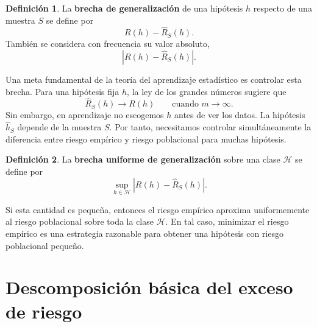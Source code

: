 \documentclass[11pt]{report}
\newenvironment{tcolorbox}[1][]{\par\medskip\noindent\ignorespaces}{\par\medskip}
\theoremstyle{definition}
\newtheorem{definicion}{Definición}[section]
\theoremstyle{plain}
\numberwithin{equation}{section}
\begin{document}
\begin{tcolorbox}[colback=blue!8, colframe=blue!8, boxrule=0pt]
\begin{definicion}
La \textbf{brecha de generalización} de una hipótesis \(h\) respecto de una muestra \(S\) se define por
\begin{equation*}
    R(h)-\widehat{R}_S(h).
\end{equation*}
También se considera con frecuencia su valor absoluto,
\begin{equation*}
    |R(h)-\widehat{R}_S(h)|.
\end{equation*}
\end{definicion}
\end{tcolorbox}

Una meta fundamental de la teoría del aprendizaje estadístico es controlar esta brecha. Para una hipótesis fija \(h\), la ley de los grandes números sugiere que
\begin{equation*}
    \widehat{R}_S(h)
    \to
    R(h)
    \qquad
    \text{cuando } m\to\infty.
\end{equation*}
Sin embargo, en aprendizaje no escogemos \(h\) antes de ver los datos. La hipótesis \(\widehat{h}_S\) depende de la muestra \(S\). Por tanto, necesitamos controlar simultáneamente la diferencia entre riesgo empírico y riesgo poblacional para muchas hipótesis.

\begin{tcolorbox}[colback=blue!8, colframe=blue!8, boxrule=0pt]
\begin{definicion}
La \textbf{brecha uniforme de generalización} sobre una clase \(\mathcal{H}\) se define por
\begin{equation*}
    \sup_{h\in\mathcal{H}}
    |R(h)-\widehat{R}_S(h)|.
\end{equation*}
\end{definicion}
\end{tcolorbox}

Si esta cantidad es pequeña, entonces el riesgo empírico aproxima uniformemente al riesgo poblacional sobre toda la clase \(\mathcal{H}\). En tal caso, minimizar el riesgo empírico es una estrategia razonable para obtener una hipótesis con riesgo poblacional pequeño.

\section{Descomposición básica del exceso de riesgo}
\end{document}
